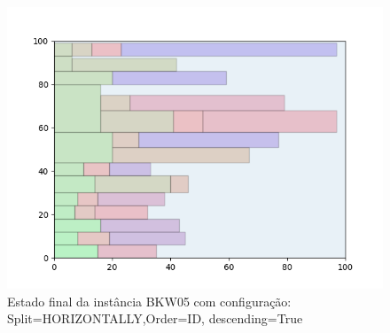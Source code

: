 \begin{figure}[H]
    \centering
    \caption[]{Estado final da instância BKW05 com configuração: Split=HORIZONTALLY,Order=ID, descending=True}
    \label{fig:bkw05-horizontally-id-true}
    \includegraphics[scale=0.5]{output/figures/bkw/bkw05/horizontally/id/true/00}
\end{figure}